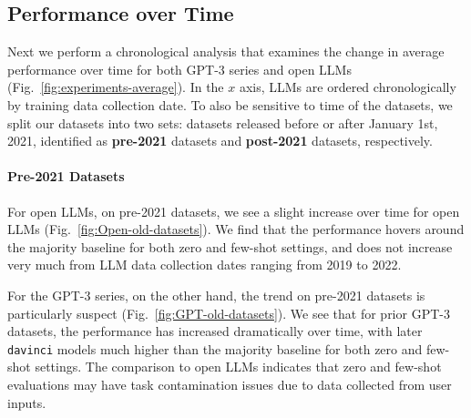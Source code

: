 \documentclass[letterpaper]{article} %
\newcommand{\nilay}[1]{}
\newcommand{\jmf}[1]{}      %
\begin{document}
\nilay{I don't quite understand why this section is separate from the previous one. I would merge them into one, and reverse the order so it reads like this: (1) for each LLM, it's more likely to outperform baseline on pre-collection datasets. (2) totalled across all LLMs and datasets, we find the likelihood of any given LLM outperforming baseline on any pre-collection dataset to be stat. sig. more than any post-collection. In my head that order sounds more natural. }


\subsection{Performance over Time}

Next we perform a chronological analysis that examines the change in average performance over time for both GPT-3 series and open LLMs (Fig.~\ref{fig:experiments-average}).\jmf{add summary of results} In the $x$ axis, LLMs are ordered chronologically by training data collection date. To also be sensitive to time of the datasets, we split our datasets into two sets: 
datasets released before or after January 1st, 2021, identified as \textbf{pre-2021} datasets and \textbf{post-2021} datasets, respectively.

\paragraph{Pre-2021 Datasets}
For open LLMs, on pre-2021 datasets, we see a slight increase over time for open LLMs (Fig.~\ref{fig:Open-old-datasets}).  We find that the performance hovers around the majority baseline for both zero and few-shot settings, and does not increase very much from LLM data collection dates ranging from 2019 to 2022.

For the GPT-3 series, on the other hand, the trend on pre-2021 datasets is particularly suspect (Fig.~\ref{fig:GPT-old-datasets}).  We see that for prior GPT-3 datasets, the performance has increased dramatically over time, with later \texttt{davinci} models much higher than the majority baseline for both zero and few-shot settings.  The comparison to open LLMs indicates that zero and few-shot evaluations may have task contamination issues due to data collected from user inputs.
\end{document}
